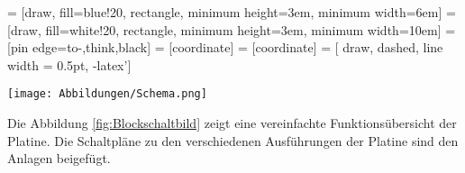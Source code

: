  = [draw, fill=blue!20, rectangle, 
    minimum height=3em, minimum width=6em]
 = [draw, fill=white!20, rectangle, 
    minimum height=3em, minimum width=10em]
 = [pin edge={to-,think,black}]
 = [coordinate]
 = [coordinate]
 = [ draw, dashed, line width = 0.5pt, -latex']
\begin{center}
\begin{minipage}{0.75\textwidth}
\texttt{[image: Abbildungen/Schema.png]}
\label{fig:Blockschaltbild}
%

\end{minipage}
\end{center}
Die Abbildung \ref{fig:Blockschaltbild} zeigt eine vereinfachte Funktionsübersicht der Platine. Die Schaltpläne zu den verschiedenen Ausführungen der Platine sind den Anlagen beigefügt.


